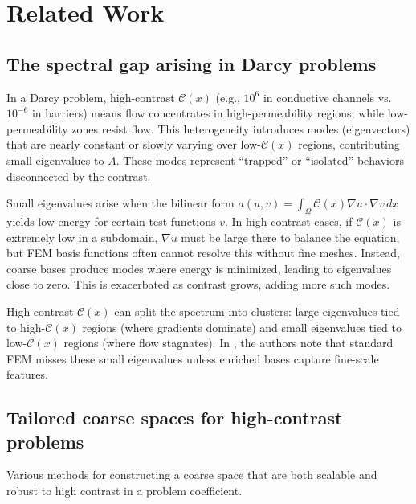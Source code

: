 \chapter{Related Work}\label{ch:literature}
\section{The spectral gap arising in Darcy problems}\label{sec:spectral_gap_darcy}
In a Darcy problem, high-contrast $ \mathcal{C}(x) $ (e.g., $ 10^6 $ in conductive channels vs.\ $ 10^{-6} $ in barriers) means flow concentrates in high-permeability regions, while low-permeability zones resist flow. This heterogeneity introduces modes (eigenvectors) that are nearly constant or slowly varying over low-$ \mathcal{C}(x) $ regions, contributing small eigenvalues to $ A $. These modes represent ``trapped'' or ``isolated'' behaviors disconnected by the contrast.

Small eigenvalues arise when the bilinear form $ a(u, v) = \int_{\Omega} \mathcal{C}(x) \nabla u \cdot \nabla v \, dx $ yields low energy for certain test functions $ v $. In high-contrast cases, if $ \mathcal{C}(x) $ is extremely low in a subdomain, $ \nabla u $ must be large there to balance the equation, but FEM basis functions often cannot resolve this without fine meshes. Instead, coarse bases produce modes where energy is minimized, leading to eigenvalues close to zero. This is exacerbated as contrast grows, adding more such modes.

High-contrast $ \mathcal{C}(x) $ can split the spectrum into clusters: large eigenvalues tied to high-$ \mathcal{C}(x) $ regions (where gradients dominate) and small eigenvalues tied to low-$ \mathcal{C}(x) $ regions (where flow stagnates). In \cite{msfem_for_darcy_Efendiev2011}, the authors note that standard FEM misses these small eigenvalues unless enriched bases capture fine-scale features.

\section{Tailored coarse spaces for high-contrast problems}\label{sec:tailored_coarse_spaces}
Various methods for constructing a coarse space that are both scalable and robust to high contrast in a problem coefficient.

